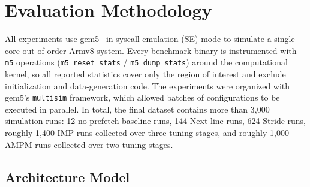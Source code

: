 \documentclass[12pt, letterpaper]{article}
\begin{document}

\FloatBarrier
\section{Evaluation Methodology}
\label{sec:eval}

All experiments use gem5~\cite{binkert-gem5-11,lowepower-gem5-20} in syscall-emulation (SE) mode to simulate a single-core out-of-order Armv8 system. Every benchmark binary is instrumented with \texttt{m5} operations (\texttt{m5\_reset\_stats} / \texttt{m5\_dump\_stats}) around the computational kernel, so all reported statistics cover only the region of interest and exclude initialization and data-generation code. The experiments were organized with gem5's \texttt{multisim} framework, which allowed batches of configurations to be executed in parallel. In total, the final dataset contains more than 3{,}000 simulation runs: 12 no-prefetch baseline runs, 144 Next-line runs, 624 Stride runs, roughly 1{,}400 IMP runs collected over three tuning stages, and roughly 1{,}000 AMPM runs collected over two tuning stages.

\subsection{Architecture Model}
\label{sec:eval:arch}


\end{document}
